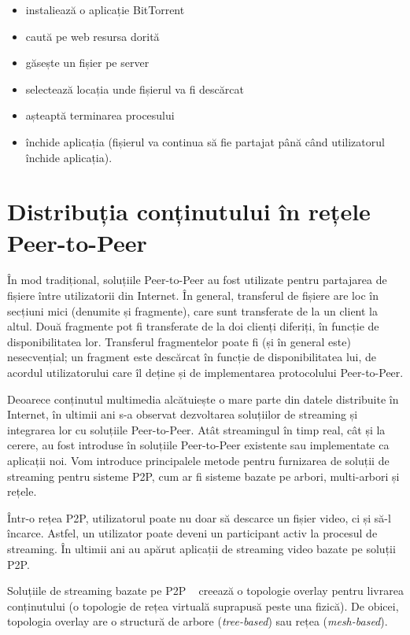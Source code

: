 \begin{itemize}
  \item instaliează o aplicație BitTorrent
  \item caută pe web resursa dorită
  \item găsește un fișier pe server
  \item selectează locația unde fișierul va fi descărcat
  \item așteaptă terminarea procesului
  \item închide aplicația (fișierul va continua să fie partajat
                până când utilizatorul închide aplicația).
\end{itemize}

\section{Distribuția conținutului în rețele Peer-to-Peer}
\label{sec:p2p-systems:streaming}

În mod tradițional, soluțiile Peer-to-Peer au fost utilizate pentru partajarea
de fișiere între utilizatorii din Internet. În general, transferul de fișiere
are loc în secțiuni mici (denumite și fragmente), care sunt transferate de
la un client la altul. Două fragmente pot fi transferate de la doi clienți
diferiți, în funcție de disponibilitatea lor. Transferul fragmentelor poate fi
(și în general este) nesecvențial; un fragment este descărcat în funcție de
disponibilitatea lui, de acordul utilizatorului care îl deține și de
implementarea protocolului Peer-to-Peer.

Deoarece conținutul multimedia alcătuiește o mare parte din datele distribuite
în Internet, în ultimii ani s-a observat dezvoltarea soluțiilor de streaming
și integrarea lor cu soluțiile Peer-to-Peer. Atât streamingul în timp real,
cât și la cerere, au fost introduse în soluțiile Peer-to-Peer existente sau
implementate ca aplicații noi. Vom introduce principalele metode pentru
furnizarea de soluții de streaming pentru sisteme P2P, cum ar fi sisteme
bazate pe arbori, multi-arbori și rețele.

Într-o rețea P2P, utilizatorul poate nu doar să descarce un fișier video,
ci și să-l încarce. Astfel, un utilizator poate deveni un participant activ
la procesul de streaming. În ultimii ani au apărut aplicații de streaming video
bazate pe soluții P2P.

Soluțiile de streaming bazate pe P2P ~\cite{p2p-streaming-survey} creează o
topologie overlay pentru livrarea conținutului (o topologie de rețea virtuală
suprapusă peste una fizică). De obicei, topologia overlay are o structură
de arbore (\textit{tree-based}) sau rețea (\textit{mesh-based}).

